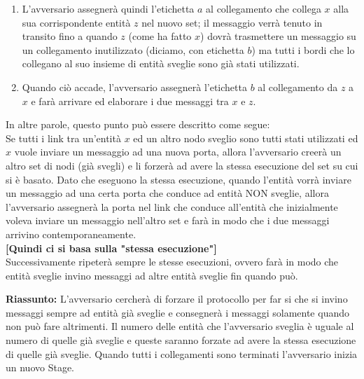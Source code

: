 \begin{enumerate}
\begin{enumerate}
\begin{enumerate}
            \item L'avversario assegnerà quindi l'etichetta $a$ al collegamento che collega $x$ alla sua corrispondente entità $z$ nel nuovo set; il messaggio verrà tenuto in transito fino a quando $z$ (come ha fatto $x$) dovrà trasmettere un messaggio su un collegamento inutilizzato (diciamo, con etichetta $b$) ma tutti i bordi che lo collegano al suo insieme di entità sveglie sono già stati utilizzati.
            \item Quando ciò accade, l'avversario assegnerà l'etichetta $b$ al collegamento da $z$ a $x$ e farà arrivare ed elaborare i due messaggi tra $x$ e $z$.
        \end{enumerate}
        In altre parole, questo punto può essere descritto come segue:\\
        Se tutti i link tra un'entità $x$ ed un altro nodo sveglio sono tutti stati utilizzati ed $x$ vuole inviare un messaggio ad una nuova porta, allora l'avversario creerà un altro set di nodi (già svegli) e li forzerà ad avere la stessa esecuzione del set su cui si è basato. Dato che eseguono la stessa esecuzione, quando l'entità vorrà inviare un messaggio ad una certa porta che conduce ad entità NON sveglie, allora l'avversario assegnerà la porta nel link che conduce all'entità che inizialmente voleva inviare un messaggio nell'altro set e farà in modo che i due messaggi arrivino contemporaneamente. \\\textbf{[Quindi ci si basa sulla "stessa esecuzione"]}\\
        Successivamente ripeterà sempre le stesse esecuzioni, ovvero farà in modo che entità sveglie invino messaggi ad altre entità sveglie fin quando può.
    \end{enumerate}
\end{enumerate}
\textbf{Riassunto:} L'avversario cercherà di forzare il protocollo per far si che si invino messaggi sempre ad entità già sveglie e consegnerà i messaggi solamente quando non può fare altrimenti. Il numero delle entità che l'avversario sveglia è uguale al numero di quelle già sveglie e queste saranno forzate ad avere la stessa esecuzione di quelle già sveglie. Quando tutti i collegamenti sono terminati l'avversario inizia un nuovo Stage.

